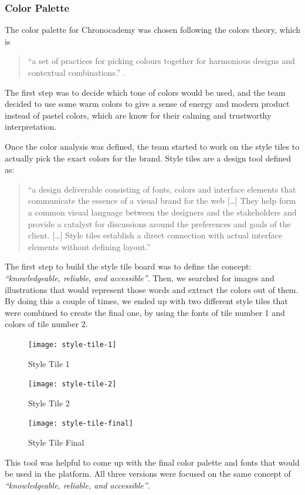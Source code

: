 \subsubsection{Color Palette}\label{subsubsec:color-palette}
The color palette for Chronocademy was chosen following the colors theory, which is

\begin{quote}
    ``a set of practices for picking colours together for harmonious designs and contextual combinations.''
    \cite[The Color Theory]{colorTheory}.
\end{quote}

The first step was to decide which tone of colors would be used, and the team decided to use some warm colors to give a sense of energy and modern product instead of pastel colors, which are know for their calming and trustworthy interpretation.

Once the color analysis was defined, the team started to work on the style tiles to actually pick the exact colors for the brand.
Style tiles are a design tool defined as:

\begin{quote}
    ``a design deliverable consisting of fonts, colors and interface elements that communicate the essence of a visual brand for the web
    [\ldots]
    They help form a common visual language between the designers and the stakeholders and provide a catalyst for discussions around the preferences and goals of the client.
    [\ldots]
    Style tiles establish a direct connection with actual interface elements without defining layout.''
    \cite[Style Tiles]{styleTiles}
\end{quote}

The first step to build the style tile board was to define the concept: \textit{``knowledgeable, reliable, and accessible''}.
Then, we searched for images and illustrations that would represent those words and extract the colors out of them.
By doing this a couple of times, we ended up with two different style tiles that were combined to create the final one, by using the fonts of tile number 1 and colors of tile number 2.\newline

\begin{figure}[h]
    \centering
    \texttt{[image: style-tile-1]}
    \caption{Style Tile 1}
    \label{fig:figure2}
\end{figure}
\begin{figure}[h]
    \centering
    \texttt{[image: style-tile-2]}
    \caption{Style Tile 2}
    \centering
    \texttt{[image: style-tile-final]}
    \caption{Style Tile Final}
    \label{fig:figure3}
\end{figure}
This tool was helpful to come up with the final color palette and fonts that would be used in the platform.
All three versions were focused on the same concept of \textit{``knowledgeable, reliable, and accessible''}.
\clearpage

